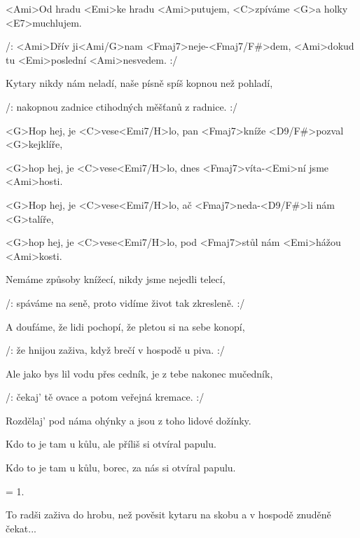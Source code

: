 

\zs
<Ami>Od hradu <Emi>ke hradu <Ami>putujem,
<C>zpíváme <G>a holky <E7>muchlujem.

/: <Ami>Dřív ji<Ami/G>nam <Fmaj7>neje-<Fmaj7/F#>dem,
<Ami>dokud tu <Emi>poslední <Ami>nesvedem. :/
\ks

\zs
Kytary nikdy nám neladí,
naše písně spíš kopnou než pohladí,

/: nakopnou zadnice
ctihodných měšťanů z radnice. :/
\ks

\zr
<G>Hop hej, je <C>vese<Emi7/H>lo,
pan <Fmaj7>kníže <D9/F#>pozval <G>kejklíře,

<G>hop hej, je <C>vese<Emi7/H>lo,
dnes <Fmaj7>víta-<Emi>ní jsme <Ami>hosti.

<G>Hop hej, je <C>vese<Emi7/H>lo,
ač <Fmaj7>neda-<D9/F#>li nám <G>talíře,

<G>hop hej, je <C>vese<Emi7/H>lo,
pod <Fmaj7>stůl nám <Emi>hážou <Ami>kosti.
\kr

\zs
Nemáme způsoby knížecí,
nikdy jsme nejedli telecí,

/: spáváme na seně,
proto vidíme život tak zkresleně. :/
\ks

\zs
A doufáme, že lidi pochopí,
že pletou si na sebe konopí,

/: že hnijou zaživa,
když brečí v hospodě u piva. :/
\ks

\zr \kr

\zs
Ale jako bys lil vodu přes cedník,
je z tebe nakonec mučedník,

/: čekaj' tě ovace
a potom veřejná kremace. :/
\ks

\zs
Rozdělaj' pod náma ohýnky
a jsou z toho lidové dožínky.

Kdo to je tam u kůlu,
ale příliš si otvíral papulu.

Kdo to je tam u kůlu,
borec, za nás si otvíral papulu.
\ks

\zr \kr

\zs
= 1.
\ks

\zs
To radši zaživa do hrobu,
než pověsit kytaru na skobu
a v hospodě znuděně čekat...
\ks

\kp





























































